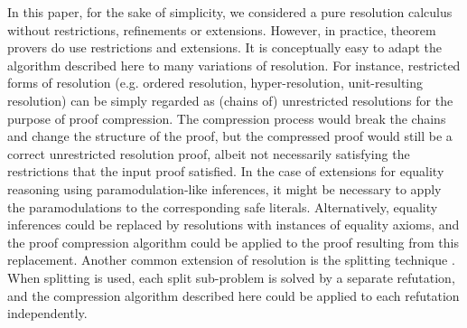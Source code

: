 In this paper, for the sake of simplicity, we considered a pure resolution calculus without restrictions, refinements or extensions. 
However, in practice, theorem provers do use restrictions and extensions. 
It is conceptually easy to adapt the algorithm described here to many variations of resolution. 
For instance, restricted forms of resolution (e.g. ordered resolution, hyper-resolution, unit-resulting resolution) can be simply regarded as (chains of) unrestricted resolutions for the purpose of proof compression. 
The compression process would break the chains and change the structure of the proof, but the compressed proof would still be a correct unrestricted resolution proof, albeit not necessarily satisfying the restrictions that the input proof satisfied. 
In the case of extensions for equality reasoning using paramodulation-like inferences, it might be necessary to apply the paramodulations to the corresponding safe literals. 
Alternatively, equality inferences could be replaced by resolutions with instances of equality axioms, and the proof compression algorithm could be applied to the proof resulting from this replacement. 
Another common extension of resolution is the splitting technique \cite{WeidenbachSplitting}. 
When splitting is used, each split sub-problem is solved by a separate refutation, and the compression algorithm described here could be applied to each refutation independently.
